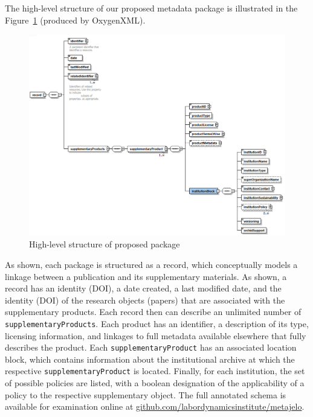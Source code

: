 The high-level structure of our proposed metadata package is illustrated in the Figure~\ref{fig:schema_v1} (produced by OxygenXML). 
\begin{figure}
	\includegraphics[width=\textwidth]{images/schema_v1}
	\caption{\label{fig:schema_v1}High-level structure of proposed package}
\end{figure} 
As shown, each package is structured as a record, which conceptually models a linkage between a publication and its supplementary materials.  As shown, a record has an identity (\ac{DOI}), a date created, a last modified date, and the identity (\ac{DOI}) of the research objects (papers) that are associated with the supplementary products.
Each record then can describe an unlimited number of \texttt{supplementaryProducts}.  Each product has an identifier, a description of its type, licensing information, and linkages to full metadata available elsewhere that fully describes the product.  Each \texttt{supplementaryProduct} has an associated location block, which contains information about the institutional archive at which the respective \texttt{supplementaryProduct} is located.  Finally, for each institution, the set of possible policies are listed, with a boolean designation of the applicability of a policy to the respective supplementary object.   
The full annotated schema is available for examination online at \href{https://github.com/labordynamicsinstitute/metajelo}{github.com/labordynamicsinstitute/metajelo}.

